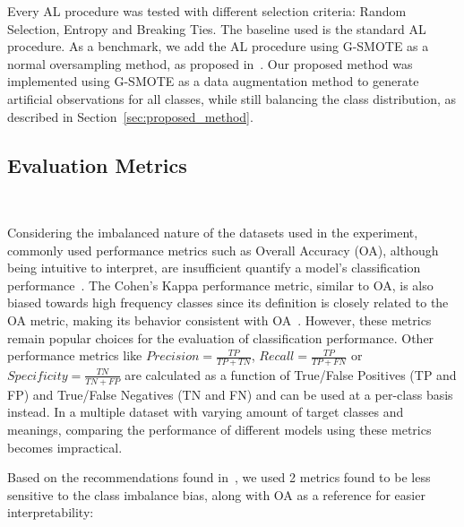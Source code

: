 \documentclass[parskip=full]{scrartcl}
\begin{document}
Every AL procedure was tested with different selection criteria: Random
Selection, Entropy and Breaking Ties. The baseline used is the standard AL
procedure. As a benchmark, we add the AL procedure using G-SMOTE as a normal
oversampling method, as proposed in~\cite{Fonseca2021}. Our proposed method
was implemented using G-SMOTE as a data augmentation method to generate
artificial observations for all classes, while still balancing the class
distribution, as described in Section~\ref{sec:proposed_method}. 

\subsection{Evaluation Metrics}~\label{sec:evaluation_metrics}

Considering the imbalanced nature of the datasets used in the experiment,
commonly used performance metrics such as Overall Accuracy (OA), although
being intuitive to interpret, are insufficient quantify a model's
classification performance~\cite{Jeni2013}. The Cohen's Kappa performance
metric, similar to OA, is also biased towards high frequency classes since its
definition is closely related to the OA metric, making its behavior consistent
with OA~\cite{Fatourechi2008}. However, these metrics remain popular choices
for the evaluation of classification performance. Other performance metrics
like $Precision = \frac{TP}{TP+TN}$, $Recall = \frac{TP}{TP+FN}$ or
$Specificity = \frac{TN}{TN + FP}$ are calculated as a function of True/False
Positives (TP and FP) and True/False Negatives (TN and FN) and can be used at
a per-class basis instead. In a multiple dataset with varying amount of target
classes and meanings, comparing the performance of different models using
these metrics becomes impractical.

Based on the recommendations found in~\cite{Jeni2013, Kubat1997}, we used 2
metrics found to be less sensitive to the class imbalance bias, along with OA
as a reference for easier interpretability:
\end{document}
